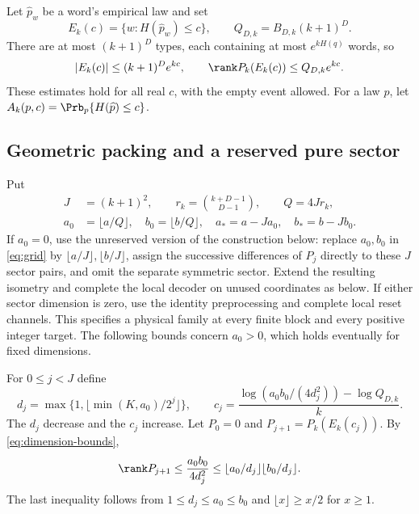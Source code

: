 Let $\widehat p_w$ be a word's empirical law and set
\[
 E_k(c)=\{w:H(\widehat p_w)\le c\},\qquad
 Q_{D,k}=B_{D,k}(k+1)^D.
\]
There are at most $(k+1)^D$ types, each containing at most $e^{kH(q)}$ words, so
\begin{equation}\label{eq:dimension-bounds}
 |E_k(c)|\le(k+1)^D e^{kc},\qquad
 \rank P_k(E_k(c))\le Q_{D,k}e^{kc}.
\end{equation}
These estimates hold for all real $c$, with the empty event allowed. For a law $p$, let $A_k(p,c)=\Prb_p\{H(\widehat p)\le c\}$.

\subsection{Geometric packing and a reserved pure sector}
Put
\begin{equation}\label{eq:reservation}
 \begin{aligned}
 J&=(k+1)^2,\qquad r_k=\binom{k+D-1}{D-1},\qquad Q=4Jr_k,\\
 a_0&=\lfloor a/Q\rfloor,\quad b_0=\lfloor b/Q\rfloor,
 \quad a_*=a-Ja_0,\quad b_*=b-Jb_0.
 \end{aligned}
\end{equation}
If $a_0=0$, use the unreserved version of the construction below: replace $a_0,b_0$ in \eqref{eq:grid} by $\lfloor a/J\rfloor,\lfloor b/J\rfloor$, assign the successive differences of $P_j$ directly to these $J$ sector pairs, and omit the separate symmetric sector. Extend the resulting isometry and complete the local decoder on unused coordinates as below. If either sector dimension is zero, use the identity preprocessing and complete local reset channels. This specifies a physical family at every finite block and every positive integer target. The following bounds concern $a_0>0$, which holds eventually for fixed dimensions.

For $0\le j<J$ define
\begin{equation}\label{eq:grid}
 d_j=\max\{1,\lfloor\min(K,a_0)/2^j\rfloor\},\qquad
 c_j=\frac{\log(a_0b_0/(4d_j^2))-\log Q_{D,k}}k.
\end{equation}
The $d_j$ decrease and the $c_j$ increase. Let $P_0=0$ and $P_{j+1}=P_k(E_k(c_j))$. By \eqref{eq:dimension-bounds},
\begin{equation}\label{eq:grid-budget}
 \rank P_{j+1}\le\frac{a_0b_0}{4d_j^2}
 \le\lfloor a_0/d_j\rfloor\lfloor b_0/d_j\rfloor.
\end{equation}
The last inequality follows from $1\le d_j\le a_0\le b_0$ and $\lfloor x\rfloor\ge x/2$ for $x\ge1$.

